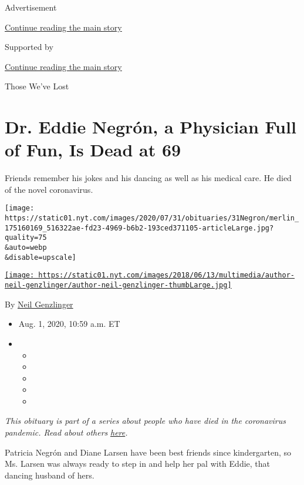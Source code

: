 Advertisement

\protect\hyperlink{after-top}{Continue reading the main story}

Supported by

\protect\hyperlink{after-sponsor}{Continue reading the main story}

Those We've Lost

\hypertarget{dr-eddie-negruxf3n-a-physician-full-of-fun-is-dead-at-69}{%
\section{Dr. Eddie Negrón, a Physician Full of Fun, Is Dead at
69}\label{dr-eddie-negruxf3n-a-physician-full-of-fun-is-dead-at-69}}

Friends remember his jokes and his dancing as well as his medical care.
He died of the novel coronavirus.

\texttt{[image: https://static01.nyt.com/images/2020/07/31/obituaries/31Negron/merlin\_175160169\_516322ae-fd23-4969-b6b2-193ced371105-articleLarge.jpg?quality=75\\\&auto=webp\\\&disable=upscale]}

\href{https://www.nytimes.com/by/neil-genzlinger}{\texttt{[image: https://static01.nyt.com/images/2018/06/13/multimedia/author-neil-genzlinger/author-neil-genzlinger-thumbLarge.jpg]}}

By \href{https://www.nytimes.com/by/neil-genzlinger}{Neil Genzlinger}

\begin{itemize}
\item
  Aug. 1, 2020, 10:59 a.m. ET
\item
  \begin{itemize}
  \item
  \item
  \item
  \item
  \item
  \end{itemize}
\end{itemize}

\emph{This obituary is part of a series about people who have died in
the coronavirus pandemic. Read about others}
\href{https://www.nytimes.com/interactive/2020/obituaries/people-died-coronavirus-obituaries.html}{\emph{here}}\emph{.}

Patricia Negrón and Diane Larsen have been best friends since
kindergarten, so Ms. Larsen was always ready to step in and help her pal
with Eddie, that dancing husband of hers.

